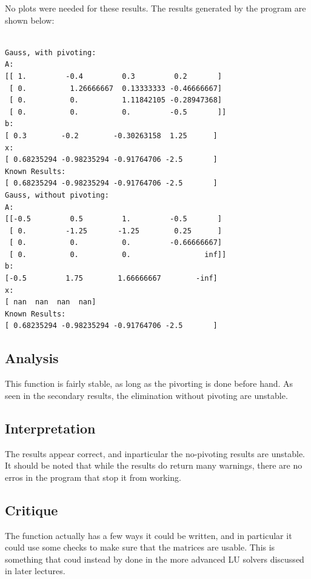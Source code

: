 \documentclass[10pt,letter]{article}
\begin{document}
No plots were needed for these results. The results generated by the program are shown below:

\begin{verbatim}

Gauss, with pivoting:
A:
[[ 1.         -0.4         0.3         0.2       ]
 [ 0.          1.26666667  0.13333333 -0.46666667]
 [ 0.          0.          1.11842105 -0.28947368]
 [ 0.          0.          0.         -0.5       ]]
b:
[ 0.3        -0.2        -0.30263158  1.25      ]
x:
[ 0.68235294 -0.98235294 -0.91764706 -2.5       ]
Known Results: 
[ 0.68235294 -0.98235294 -0.91764706 -2.5       ]
Gauss, without pivoting:
A:
[[-0.5         0.5         1.         -0.5       ]
 [ 0.         -1.25       -1.25        0.25      ]
 [ 0.          0.          0.         -0.66666667]
 [ 0.          0.          0.                 inf]]
b:
[-0.5         1.75        1.66666667        -inf]
x:
[ nan  nan  nan  nan]
Known Results: 
[ 0.68235294 -0.98235294 -0.91764706 -2.5       ]
\end{verbatim}

\subsection{Analysis}

This function is fairly stable, as long as the pivorting is done before hand. As seen in the secondary results, the elimination without pivoting are unstable.

\subsection{Interpretation}

The results appear correct, and inparticular the no-pivoting results are unstable. It should be noted that while the results do return many warnings, there are no erros in the program that stop it from working.

\subsection{Critique}

The function actually has a few ways it could be written, and in particular it could use some checks to make sure that the matrices are usable. This is something that coud instead by done in the more advanced LU solvers discussed in later lectures.
\end{document}
